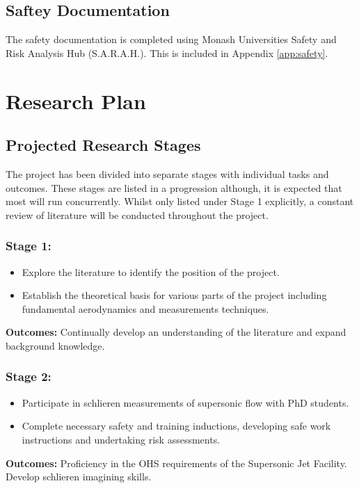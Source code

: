\subsection{Saftey Documentation} 
The safety documentation is completed using Monash Universities Safety and Risk Analysis Hub (S.A.R.A.H.). This is included in Appendix \ref{app:safety}.

\section{Research Plan}

\subsection{Projected Research Stages}

The project has been divided into separate stages with individual tasks and outcomes. These stages are listed in a progression although, it is expected that most will run concurrently. Whilst only listed under Stage 1 explicitly, a constant review of literature will be conducted throughout the project.

\subsubsection*{Stage 1:}
\begin{itemize}
	\item Explore the literature to identify the position of the project.
	\item Establish the theoretical basis for various parts of the project including fundamental aerodynamics and measurements techniques.
\end{itemize}
\textbf{Outcomes:} Continually develop an understanding of the literature and expand background knowledge.

\subsubsection*{Stage 2:}
\begin{itemize}
	\item Participate in schlieren measurements of supersonic flow with PhD students.
	\item Complete necessary safety and training inductions, developing safe work instructions and undertaking risk assessments.
\end{itemize}
\textbf{Outcomes:} Proficiency in the OHS requirements of the Supersonic Jet Facility. Develop schlieren imagining skills.

